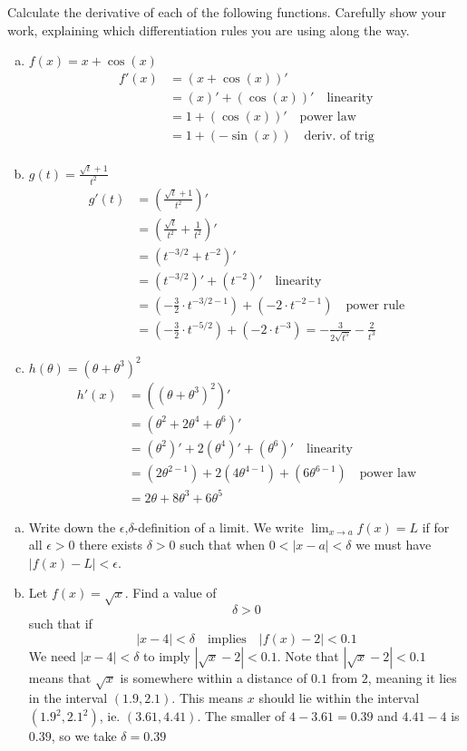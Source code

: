 \documentclass[11pt]{exam}
\theoremstyle{definition}
\begin{document}
\begin{questions}
\newpage
\question[10]
Calculate the derivative of each of the following functions.
Carefully show your work, explaining which differentiation rules you are using along the way.
\begin{enumerate}[(a)]
\item $f(x) = x + \cos(x)$
\begin{align*}
f'(x)
 &= (x+\cos(x))'\\
 &= (x)'+(\cos(x))'\quad\text{linearity}\\
 &= 1+(\cos(x))'\quad\text{power law}\\
 &= 1+(-\sin(x))\quad\text{deriv. of trig}\\
\end{align*}
\item $g(t) = \frac{\sqrt{t}+1}{t^2}$
\begin{align*}
g'(t)
 & = \left(\frac{\sqrt{t}+1}{t^2}\right)'\\
 & = \left(\frac{\sqrt{t}}{t^2}+\frac{1}{t^2}\right)'\\
 & = (t^{-3/2}+t^{-2})'\\
 & = (t^{-3/2})'+(t^{-2})'\quad\text{linearity}\\
 & = (-\frac{3}{2}\cdot t^{-3/2-1})+(-2\cdot t^{-2-1})\quad\text{power rule}\\
 & = (-\frac{3}{2}\cdot t^{-5/2})+(-2\cdot t^{-3}) = -\frac{3}{2\sqrt{t^5}} - \frac{2}{t^3}
\end{align*}
\item $h(\theta) = (\theta + \theta^3)^2$
\begin{align*}
h'(x)
 & = ((\theta + \theta^3)^2)'\\
 & = (\theta^2 + 2\theta^4 + \theta^6)'\\
 & = (\theta^2)' + 2(\theta^4)' + (\theta^6)'\quad\text{linearity}\\
 & = (2\theta^{2-1}) + 2(4\theta^{4-1}) + (6\theta^{6-1})\quad\text{power law}\\
 & = 2\theta + 8\theta^3 + 6\theta^5
\end{align*}
\end{enumerate}

\newpage
\question[10]
\begin{enumerate}[(a)]
\item Write down the $\epsilon$,$\delta$-definition of a limit.
We write $\lim_{x\rightarrow a} f(x) = L$ if for all $\epsilon > 0$ there exists $\delta > 0$ such that when $0 < |x-a| < \delta$ we must have $|f(x)-L|<\epsilon$.
\item Let $f(x) = \sqrt{x}$.  Find a value of $$\delta > 0$$ such that if
$$|x-4| < \delta\quad\text{implies}\quad |f(x)-2| < 0.1$$
We need $|x-4| < \delta$ to imply $|\sqrt{x}-2| < 0.1$.
Note that $|\sqrt{x}-2| < 0.1$ means that $\sqrt{x}$ is somewhere within a distance of $0.1$ from $2$, meaning it lies in the interval $(1.9,2.1)$.
This means $x$ should lie within the interval $(1.9^2,2.1^2)$, ie. $(3.61,4.41)$.
The smaller of $4-3.61=0.39$ and $4.41-4$ is $0.39$, so we take $\delta = 0.39$
\end{enumerate}



\end{questions}
\end{document}
